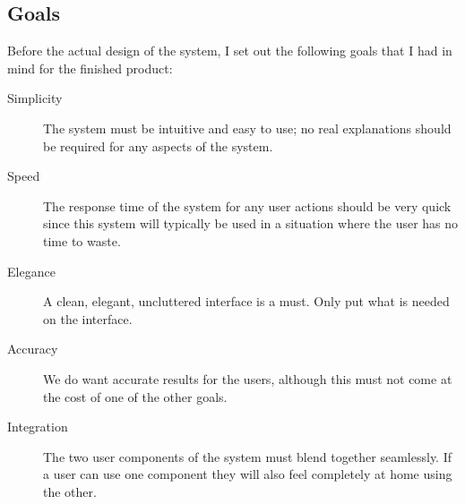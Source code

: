 \subsection{Goals}
Before the actual design of the system, I set out the following goals that I had in mind for the finished product:
\begin{description}
\item [Simplicity] The system must be intuitive and easy to use; no real explanations should be required for any aspects of the system. 
\item [Speed] The response time of the system for any user actions should be very quick since this system will typically be used in a situation where the user has no time to waste. 
\item [Elegance] A clean, elegant, uncluttered interface is a must. Only put what is needed on the interface.  
\item [Accuracy] We do want accurate results for the users, although this must not come at the cost of one of the other goals.
\item [Integration] The two user components of the system must blend together seamlessly. If a user can use one component they will also feel completely at home using the other. 
\end{description}
